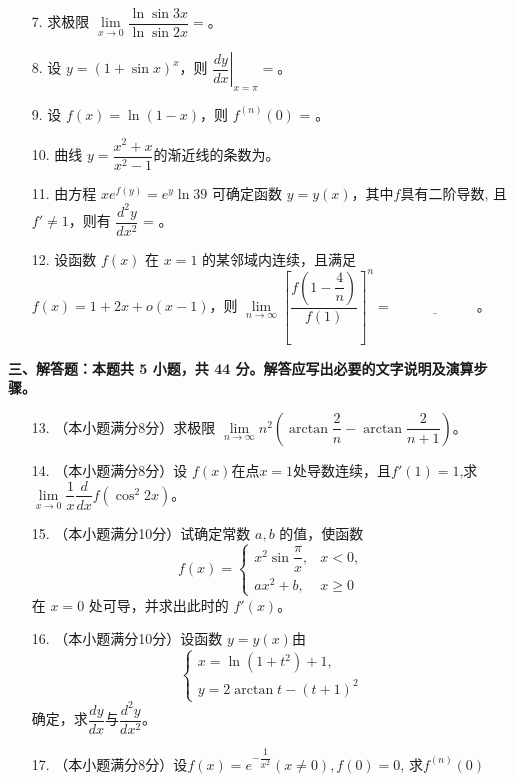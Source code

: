 \documentclass[a4paper,12pt]{article}
\begin{document}
\begin{enumerate}
    \item[7.] 求极限 $\underset{x \to 0}{\lim} \dfrac{\ln \sin 3x}{\ln \sin 2x} = $\underline{\qquad\qquad\qquad}。
    
    \item[8.] 设 $y = (1+\sin{x})^x$，则 $\left. \dfrac{dy}{dx} \right|_{x=\pi} = $\underline{\qquad\qquad\qquad}。
    
    \item[9.] 设 $f(x) = \ln{(1-x)} $，则 $ f^{(n)}(0) $ = \underline{\qquad\qquad\qquad}。
    
    \item[10.] 曲线 \( y = \dfrac{x^2 +x}{x^2 -1} \)的渐近线的条数为\underline{\qquad\qquad\qquad}。

    \item[11.] 由方程 \( xe^{f(y)} = e^y \ln{39} \) 可确定函数 \( y = y(x) \)，其中\(f \)具有二阶导数, 且\(f'\neq1\)，则有 \( \dfrac{d^2 y}{dx^2} \) = \underline{\qquad\qquad\qquad}。

    \item[12.] 设函数 \( f(x) \) 在 \( x = 1 \) 的某邻域内连续，且满足 \( f(x) = 1 + 2x + o(x - 1) \)，则 \( \underset{n \to \infty}{\lim} \left[ \dfrac{f\left(1 - \dfrac{4}{n}\right)}{f(1)} \right]^n = \underline{\qquad\qquad\qquad} \)。

\end{enumerate}

\noindent
\textbf{三、解答题：本题共 5 小题，共 44 分。解答应写出必要的文字说明及演算步骤。}

\begin{enumerate}
    \item[13.]（本小题满分8分）求极限 \( \underset{n \to \infty}{\lim} n^2 \left( \arctan \dfrac{2}{n} - \arctan \dfrac{2}{n+1} \right) \)。

    \item[14.]（本小题满分8分）设 $f(x) $在点$x=1 $处导数连续，且$f'(1)=1$,求$\underset{x \to 0}{\lim}\dfrac{1}{x}\dfrac{d}{dx}f(\cos^2{2x})$。

    \item[15.]（本小题满分10分）试确定常数 \( a, b \) 的值，使函数
    \[
    f(x) = \begin{cases}
        x^2 \sin{\dfrac{\pi}{x}}, & x < 0, \\
        ax^2 + b, & x \geq 0
    \end{cases}
    \]
    在 \( x = 0 \) 处可导，并求出此时的 \( f'(x) \)。


    \item[16.]（本小题满分10分）设函数 \( y=y(x) \)由
    \[
    \begin{cases}
        x=\ln{(1+t^2)}+1, \\
        y=2\arctan{t} - (t+1)^2
    \end{cases}
    \]
    确定，求\( \dfrac{dy}{dx} \)与\( \dfrac{d^2 y}{dx^2} \)。

    \item[17.]（本小题满分8分）设$f(x)=e^{-\dfrac{1}{x^2}}(x\neq0),f(0)=0$, 求$f^{(n)}(0)$

\end{enumerate}
\end{document}
